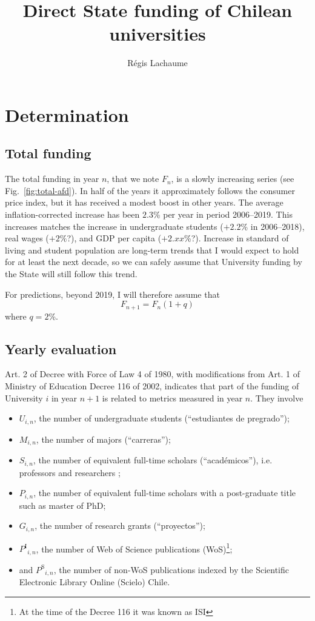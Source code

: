 \documentclass[twocolumn]{article}
\title{Direct State funding of Chilean universities}
\author{Régis Lachaume}
\def\npup{\ensuremath{U}}
\def\nmaj{\ensuremath{M}}
\def\nprof{\ensuremath{S}}
\def\ngrad{\ensuremath{P}}
\def\ngrant{\ensuremath{G}}
\def\nisi{\ensuremath{P^\text{I}}}
\def\nscielo{\ensuremath{P^\text{S}}}
\begin{document}
\maketitle

\section{Determination}
\subsection{Total funding}
The total funding in year $n$, that we note $F_{n}$, is a slowly increasing series (see Fig.~\ref{fig:total-afd}). In half of the years it approximately follows the consumer price index, but it has received a modest boost in other years.  The average inflation-corrected increase has been $2.3$\% per year in period 2006--2019. This increases matches the increase in undergraduate students ($+2.2\%$ in 2006--2018), real wages ($+2\%$?), and GDP per capita ($+2.xx$\%?). Increase in standard of living and student population are long-term trends that I would expect to hold for at least the next decade, so we can safely assume that University funding by the State will still follow this trend.

For predictions, beyond 2019, I will therefore assume that
\begin{equation}
    F_{n+1} = F_n (1 + q) \label{eq:F}
\end{equation}
where $q = 2$\%.

\subsection{Yearly evaluation}
\label{sec:metrics}

Art. 2 of Decree with Force of Law 4 of 1980, with modifications from Art. 1 of Ministry of Education Decree 116 of 2002, indicates that part of the funding of University $i$ in year $n+1$ is related to metrics measured in year $n$. They involve 
\begin{itemize}
\item $\npup_{i,n}$, the number of undergraduate students (``estudiantes de pregrado'');
\item $\nmaj_{i,n}$, the number of majors (``carreras'');
\item $\nprof_{i,n}$, the number of equivalent full-time scholars (``académicos''), i.e. professors and researchers ;
\item $\ngrad_{i,n}$, the number of equivalent full-time scholars with a post-graduate title such as master of PhD; 
\item $\ngrant_{i,n}$, the number of research grants (``proyectos'');
\item $\nisi_{i,n}$, the number of Web of Science publications (WoS)\footnote{At the time of the Decree 116 it was known as ISI}; 
\item and $\nscielo_{i,n}$, the number of non-WoS publications indexed by the Scientific Electronic Library Online (Scielo) Chile. 
\end{itemize}
\end{document}

